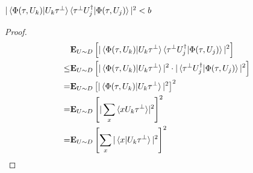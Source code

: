 \documentclass[manuscript,screen,review]{acmart}
\begin{document}
\begin{claim}
  $|\braket{\Phi(\tau,U_{k})|U_{k}\tau^{\perp}}\braket{\tau^{\perp}U^{\dagger}_{j}|\Phi(\tau,U_{j})}|^{2} < b$
\end{claim}
\begin{proof}
  
  \begin{equation*}
    \begin{split}
      & \exppm{|\braket{\Phi(\tau,U_{k})|U_{k}\tau^{\perp}}\braket{\tau^{\perp}U^{\dagger}_{j}|\Phi(\tau,U_{j})}|^{2} }{U \sim D  } \\
      \le &  \exppm{|\braket{\Phi(\tau,U_{k})|U_{k}\tau^{\perp}}|^{2}\cdot |\braket{\tau^{\perp}U^{\dagger}_{j}|\Phi(\tau,U_{j})}|^{2} }{U \sim D  } \\ 
      = &  \exppm{|\braket{\Phi(\tau,U_{k})|U_{k}\tau^{\perp}}|^{2} }{U \sim D  }^{2} \\ 
      = & \exppm{|\sum_{x}{\braket{xU_{k}\tau^{\perp}}} |^{2}}{U \sim D  }^{2} \\
      = & \exppm{\sum_{x}{|\braket{x|U_{k}\tau^{\perp}}|^{2}} }{U \sim D  }^{2} 
    \end{split}
  \end{equation*}
\end{proof}
\printbibliography
\end{document}
